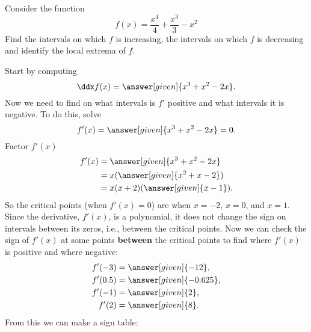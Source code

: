 \documentclass{ximera}
\begin{document}
\begin{example}\label{E:localextrema}
Consider the function 
\[
f(x) = \frac{x^4}{4}+\frac{x^3}{3}-x^2
\]
Find the intervals on which $f$ is increasing, the intervals on which $f$ is decreasing and
identify the local extrema of $f$.


\begin{explanation}
Start by computing
\[
\ddx f(x) = \answer[given]{x^3+x^2-2x}.
\]
Now we need to find on what intervals is $f'$ positive and what intervals it is
negative. To do this, solve 
\[
f'(x) = \answer[given]{x^3+x^2-2x} =0.
\]
Factor $f'(x)$
\begin{align*}
f'(x) &= \answer[given]{x^3+x^2-2x} \\
&=x(\answer[given]{x^2+x-2})\\
&=x(x+2)(\answer[given]{x-1}).
\end{align*}
So the critical points (when $f'(x)=0$) are when $x=-2$, $x=0$, and
$x=1$. Since the derivative, $f'(x)$, is a polynomial, it does not change the sign on intervals between its zeros, i.e., between the critical points. Now we can check the sign of $f'(x)$ at some points \textbf{between} the critical points to find
where $f'(x)$ is positive and where negative:
\begin{align*}
  f'(-3)&=\answer[given]{-12},\\
  f'(0.5)&=\answer[given]{-0.625},\\
  f'(-1)&=\answer[given]{2},\\
  f'(2)&=\answer[given]{8}.
\end{align*}
From this we can make a sign table:

\begin{image}
\end{image}
\end{explanation}
\end{example}
\end{document}
